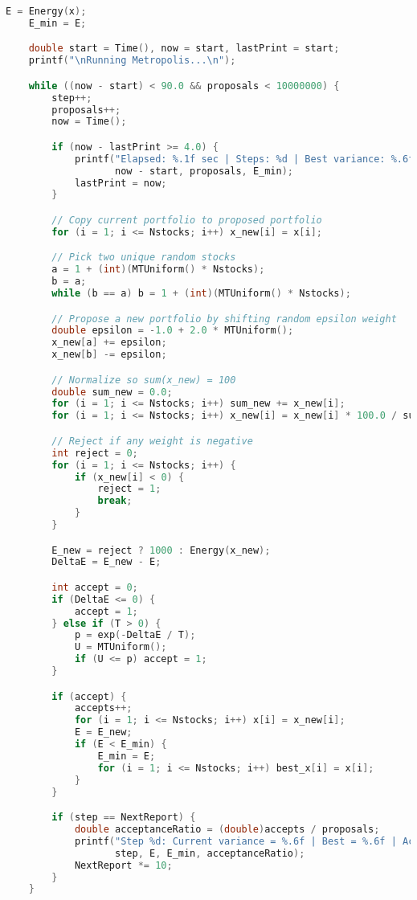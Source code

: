 \documentclass{report}
\begin{document}
\begin{lstlisting}[language=c++]
    E = Energy(x);
    E_min = E;

    double start = Time(), now = start, lastPrint = start;
    printf("\nRunning Metropolis...\n");

    while ((now - start) < 90.0 && proposals < 10000000) {
        step++;
        proposals++;
        now = Time();

        if (now - lastPrint >= 4.0) {
            printf("Elapsed: %.1f sec | Steps: %d | Best variance: %.6f\n",
                   now - start, proposals, E_min);
            lastPrint = now;
        }

        // Copy current portfolio to proposed portfolio 
        for (i = 1; i <= Nstocks; i++) x_new[i] = x[i];

        // Pick two unique random stocks
        a = 1 + (int)(MTUniform() * Nstocks);
        b = a;
        while (b == a) b = 1 + (int)(MTUniform() * Nstocks);

        // Propose a new portfolio by shifting random epsilon weight
        double epsilon = -1.0 + 2.0 * MTUniform();
        x_new[a] += epsilon;
        x_new[b] -= epsilon;

        // Normalize so sum(x_new) = 100
        double sum_new = 0.0;
        for (i = 1; i <= Nstocks; i++) sum_new += x_new[i];
        for (i = 1; i <= Nstocks; i++) x_new[i] = x_new[i] * 100.0 / sum_new;

        // Reject if any weight is negative
        int reject = 0;
        for (i = 1; i <= Nstocks; i++) {
            if (x_new[i] < 0) {
                reject = 1;
                break;
            }
        }

        E_new = reject ? 1000 : Energy(x_new);
        DeltaE = E_new - E;

        int accept = 0;
        if (DeltaE <= 0) {
            accept = 1;
        } else if (T > 0) {
            p = exp(-DeltaE / T);
            U = MTUniform();
            if (U <= p) accept = 1;
        }

        if (accept) {
            accepts++;
            for (i = 1; i <= Nstocks; i++) x[i] = x_new[i];
            E = E_new;
            if (E < E_min) {
                E_min = E;
                for (i = 1; i <= Nstocks; i++) best_x[i] = x[i];
            }
        }

        if (step == NextReport) {
            double acceptanceRatio = (double)accepts / proposals;
            printf("Step %d: Current variance = %.6f | Best = %.6f | Acceptance ratio = %.4f\n",
                   step, E, E_min, acceptanceRatio);
            NextReport *= 10;
        }
    }


\end{lstlisting}
\end{document}
